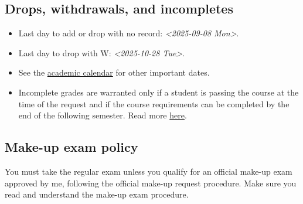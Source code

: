 \documentclass[11pt]{article}
\begin{document}
\subsection*{Drops, withdrawals, and incompletes}
\label{sec:org17de7ac}
\begin{itemize}
\item Last day to add or drop with no record: \textit{<2025-09-08 Mon>}.
\item Last day to drop with W: \textit{<2025-10-28 Tue>}.
\item See the \href{https://www.umass.edu/registrar/academic-calendar}{academic calendar} for other important dates.
\item Incomplete grades are warranted only if a student is passing the course at the
time of the request and if the course requirements can be completed by the
end of the following semester. Read more \href{https://www.umass.edu/natural-sciences/advising/petitions-and-forms/incomplete-grade-form}{here}.
\end{itemize}

\subsection*{Make-up exam policy}
\label{sec:orgeb6ad88}
You must take the regular exam unless you qualify for an official make-up exam
approved by me, following the official make-up request procedure. Make sure you
read and understand the make-up exam procedure.
\end{document}
